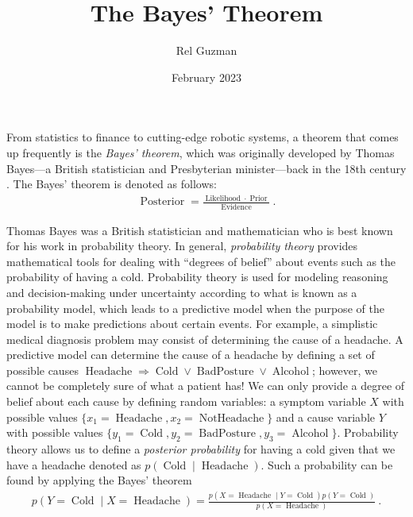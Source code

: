 

\DeclareMathOperator*{\argmax}{argmax} %

\title{The Bayes' Theorem}

\author{Rel Guzman}
\date{February 2023}




\maketitle

From statistics to finance to cutting-edge robotic systems, a theorem that comes up frequently is the \textit{Bayes' theorem}, which was originally developed by Thomas Bayes—a British statistician and Presbyterian minister—back in the 18th century \parencite{andersson2022introduction}. The Bayes' theorem is denoted as follows:
\begin{align}
\operatorname{Posterior} = \frac{\operatorname{Likelihood} \cdot \operatorname{Prior}}{\operatorname{Evidence}}~.
\end{align}

Thomas Bayes was a British statistician and mathematician who is best known for his work in probability theory. In general, \textit{probability theory} provides mathematical tools for dealing with \enquote{degrees of belief} \parencite{russell2010artificial} about events such as the probability of having a cold. Probability theory is used for modeling reasoning and decision-making under uncertainty according to what is known as a probability model, which leads to a predictive model when the purpose of the model is to make predictions about certain events. For example, a simplistic medical diagnosis problem may consist of determining the cause of a headache. A predictive model can determine the cause of a headache by defining a set of possible causes $\operatorname{Headache} \Rightarrow \operatorname{Cold} \lor \operatorname{BadPosture} \lor \operatorname{Alcohol}$; however, we cannot be completely sure of what a patient has! We can only provide a degree of belief about each cause by defining random variables: a symptom variable $X$ with possible values $\{x_1=\operatorname{Headache}, x_2=\operatorname{NotHeadache}\}$ and a cause variable $Y$ with possible values $\{y_1=\operatorname{Cold}, y_2=\operatorname{BadPosture}, y_3=\operatorname{Alcohol}\}$. Probability theory allows us to define a \textit{posterior probability} for having a cold given that we have a headache denoted as $p(\operatorname{Cold} \mid \operatorname{Headache})$. Such a probability can be found by applying the Bayes' theorem
\begin{align}
p(Y=\operatorname{Cold} \mid X=\operatorname{Headache}) = \frac{p(X=\operatorname{Headache} \mid Y=\operatorname{Cold}) p(Y=\operatorname{Cold})}{p(X=\operatorname{Headache})}~.
\end{align}

